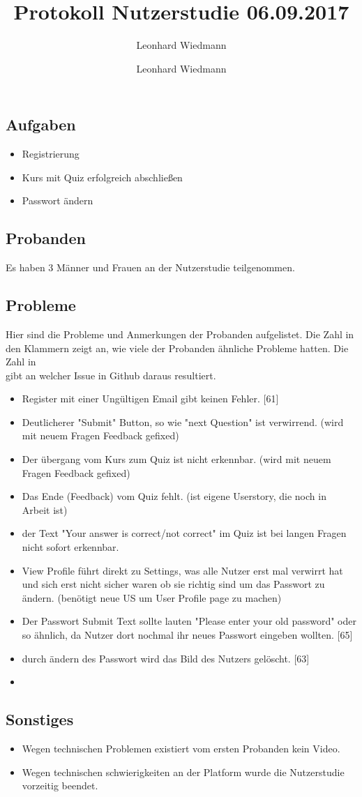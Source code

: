 \documentclass[colorback, accentcolor=tud1c, paper=a4]{tudexercise}
\title{Protokoll Nutzerstudie 06.09.2017}
\subtitle{Leonhard Wiedmann}
\author{Leonhard Wiedmann}
\begin{document}
\maketitle
\subsection*{Aufgaben}
\begin{itemize}
  \item Registrierung
  \item Kurs mit Quiz erfolgreich abschließen
  \item Passwort ändern
\end{itemize}

\subsection*{Probanden}
Es haben 3 Männer und Frauen an der Nutzerstudie teilgenommen.

\subsection*{Probleme}
 Hier sind die Probleme und Anmerkungen der Probanden aufgelistet. Die Zahl in den Klammern zeigt an, wie viele der Probanden ähnliche Probleme hatten. Die Zahl in \[\] gibt an welcher Issue in Github daraus resultiert.
  \begin{itemize}
		\item Register mit einer Ungültigen Email gibt keinen Fehler. [61]
    \item Deutlicherer "Submit" Button, so wie "next Question" ist verwirrend. (wird mit neuem Fragen Feedback gefixed)
		\item Der übergang vom Kurs zum Quiz ist nicht erkennbar. (wird mit neuem Fragen Feedback gefixed)
		\item Das Ende (Feedback) vom Quiz fehlt. (ist eigene Userstory, die noch in Arbeit ist)
		\item der Text "Your answer is correct/not correct" im Quiz ist bei langen Fragen nicht sofort erkennbar.
		\item View Profile führt direkt zu Settings, was alle Nutzer erst mal verwirrt hat und sich erst nicht sicher waren ob sie richtig sind um das Passwort zu ändern. (benötigt neue US um User Profile page zu machen)
		\item Der Passwort Submit Text sollte lauten "Please enter your old password" oder so ähnlich, da Nutzer dort nochmal ihr neues Passwort eingeben wollten. [65]
		\item durch ändern des Passwort wird das Bild des Nutzers gelöscht. [63]
		\item
   \end{itemize}

   \subsection*{Sonstiges}
	 	\begin{itemize}
			\item Wegen technischen Problemen existiert vom ersten Probanden kein Video.
			\item Wegen technischen schwierigkeiten an der Platform wurde die Nutzerstudie vorzeitig beendet.
		\end{itemize}
\end{document}
